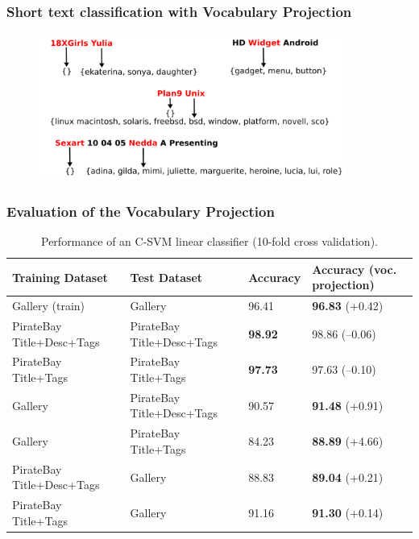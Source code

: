 \begin{frame}[fragile]
\frametitle{Short text classification with Vocabulary Projection}

\begin{figure}
\center
\includegraphics[width=0.9\textwidth]{./figures/vp-ex}
\end{figure}
\end{frame}


\begin{frame}
\frametitle{Evaluation of the Vocabulary Projection}
\begin{table}
\tiny

\centering
\begin{tabular}{|l|l|l|l|}

\hline
\bf Training Dataset & \bf Test Dataset & \bf Accuracy  & \textbf{Accuracy (voc. projection)} \\ \hline    

Gallery (train) & Gallery  & 96.41 & \textbf{96.83} (+0.42) \\
PirateBay Title+Desc+Tags & PirateBay Title+Desc+Tags &  \textbf{98.92} &  98.86 (--0.06)\\
PirateBay Title+Tags & PirateBay Title+Tags & \textbf{97.73} & 97.63 (--0.10) \\
Gallery & PirateBay Title+Desc+Tags & 90.57 & \textbf{91.48} (+0.91) \\
\alert{Gallery}  & \alert{PirateBay Title+Tags}  & \alert{84.23} & \alert{\textbf{88.89}} \alert{(+4.66)} \\
PirateBay Title+Desc+Tags & Gallery  & 88.83 & \textbf{89.04} (+0.21) \\
PirateBay Title+Tags & Gallery & 91.16 & \textbf{91.30} (+0.14) \\
\hline

\end{tabular}
\caption{ Performance of an C-SVM linear classifier (10-fold cross validation). }
\label{tbl:results2}

\end{table}
\end{frame}



